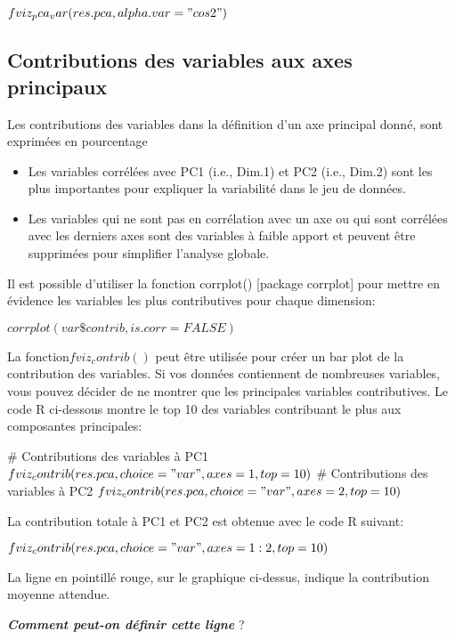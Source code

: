\documentclass[10pt,a4paper]{report}
\begin{document}
$fviz_pca_var(res.pca, alpha.var = "cos2")$

\subsection{Contributions des variables aux axes principaux}

Les contributions des variables dans la définition d’un axe principal donné, sont exprimées en pourcentage \\

\begin{itemize}
\item Les variables corrélées avec PC1 (i.e., Dim.1) et PC2 (i.e., Dim.2) sont les plus importantes pour expliquer la variabilité dans le jeu de données.
\item Les variables qui ne sont pas en corrélation avec un axe ou qui sont corrélées avec les derniers axes sont des variables à faible apport et peuvent être supprimées pour simplifier l’analyse globale.

\end{itemize}

Il est possible d’utiliser la fonction corrplot() [package corrplot] pour mettre en évidence les variables les plus contributives pour chaque dimension:

$corrplot(var\$contrib, is.corr=FALSE) $  

La fonction$ fviz_contrib()$  peut être utilisée pour créer un bar plot de la contribution des variables. Si vos données contiennent de nombreuses variables, vous pouvez décider de ne montrer que les principales variables contributives. Le code R ci-dessous montre le top 10 des variables contribuant le plus aux composantes principales:

\# Contributions des variables à PC1
$fviz_contrib(res.pca, choice = "var", axes = 1, top = 10)$
\# Contributions des variables à PC2
$fviz_contrib(res.pca, choice = "var", axes = 2, top = 10)$


La contribution totale à PC1 et PC2 est obtenue avec le code R suivant:

$fviz_contrib(res.pca, choice = "var", axes = 1:2, top = 10)$

La ligne en pointillé rouge, sur le graphique ci-dessus, indique la contribution moyenne attendue. 

\textit{\textbf{Comment peut-on définir cette ligne}} ?

\end{document}
